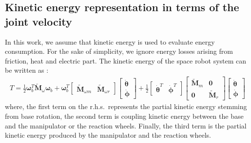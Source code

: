 \documentclass[preprint,12pt]{elsarticle}
\def\thd{{\dot{\bbm{\theta}}}}
\def\phd{{\dot{{\bbm{\phi}}}}}
\def\tbm#1{{\tilde{\bbm{#1}}}}
\def\bmat#1{{\begin{bmatrix} #1 \end{bmatrix}}}
\def\bbm#1{\bm{#1}}
\begin{document}
\subsection{Kinetic energy representation in terms of the joint velocity}
In this work,
we assume that kinetic energy is used to evaluate energy consumption.
For the sake of simplicity,
we ignore energy losses arising from friction, heat and electric part.
The kinetic energy of the space robot system can be written as \cite{Masutani,Dimitrov2004}:
%
\begin{align}
  T = \frac{1}{2}\bm{\omega}_{b}^{T}\tbm{M}_{\omega}\bm{\omega}_{b} +
  \bm{\omega}_{b}^{T}\bmat{\tbm{M}_{\omega m} & \tbm{M}_{\omega r}}\bmat{\thd \\ \phd}
  + \frac{1}{2}\bmat{\thd^{T} & \phd^{T}}\bmat{\tbm{M}_{m} & \bm{0} \\ \bm{0} & \tbm{M}_{r}}\bmat{\thd \\ \phd}\label{eq:kin1}
\end{align}
%
where,
the first term on the r.h.s.\ represents the partial kinetic energy stemming from base rotation,
the second term is coupling kinetic energy between the base and the manipulator or the reaction wheels.
Finally,
the third term is the partial kinetic energy produced by the manipulator and the reaction wheels.
\end{document}
